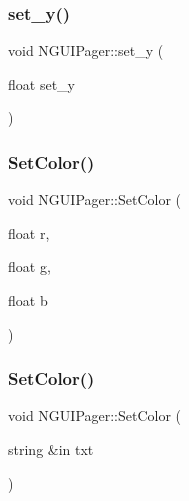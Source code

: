 \subsubsection{\texorpdfstring{set\+\_\+y()}{set\_y()}}
{\footnotesize\ttfamily void N\+G\+U\+I\+Pager\+::set\+\_\+y (\begin{DoxyParamCaption}\item[{float}]{set\+\_\+y }\end{DoxyParamCaption})}

\hypertarget{class_n_g_u_i_pager_a56c05b82ab3a5a5bff1aaad16218b814}{}\label{class_n_g_u_i_pager_a56c05b82ab3a5a5bff1aaad16218b814} 
\subsubsection{\texorpdfstring{Set\+Color()}{SetColor()}\hspace{0.1cm}{\footnotesize\ttfamily [1/2]}}
{\footnotesize\ttfamily void N\+G\+U\+I\+Pager\+::\+Set\+Color (\begin{DoxyParamCaption}\item[{float}]{r,  }\item[{float}]{g,  }\item[{float}]{b }\end{DoxyParamCaption})}

\hypertarget{class_n_g_u_i_pager_a943b1793c7f7539d6607dd61c3df3337}{}\label{class_n_g_u_i_pager_a943b1793c7f7539d6607dd61c3df3337} 
\subsubsection{\texorpdfstring{Set\+Color()}{SetColor()}\hspace{0.1cm}{\footnotesize\ttfamily [2/2]}}
{\footnotesize\ttfamily void N\+G\+U\+I\+Pager\+::\+Set\+Color (\begin{DoxyParamCaption}\item[{string \&in}]{txt }\end{DoxyParamCaption})}

\hypertarget{class_n_g_u_i_pager_a5d4ceca5659fa24c302d2eb7a5410450}{}\label{class_n_g_u_i_pager_a5d4ceca5659fa24c302d2eb7a5410450} 
